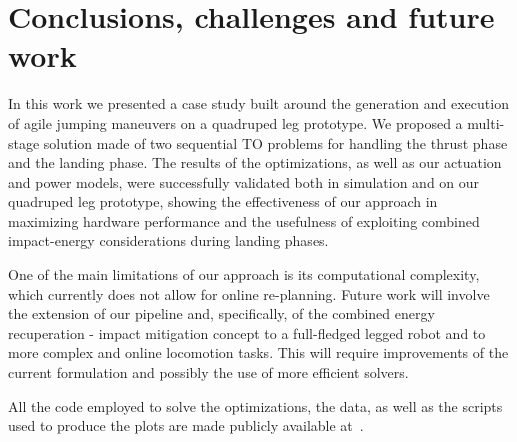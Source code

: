 \section{Conclusions, challenges and future work}\label{sec:conclusions}
In this work we presented a case study built around the generation and execution of agile jumping maneuvers on a quadruped leg prototype.  
We 
proposed a multi-stage solution 
made of two sequential TO problems for handling the thrust phase 
and the landing phase.
The results of the optimizations, as well as our actuation and power models, were successfully validated both in simulation and on our quadruped leg prototype, showing the effectiveness of our approach in maximizing hardware performance and the usefulness of exploiting combined impact-energy considerations during landing phases.

One of the main limitations of our approach is its computational complexity, which currently does not allow for online re-planning. Future work will involve the extension of our pipeline and, specifically, of the combined energy recuperation - impact mitigation concept to a full-fledged legged robot and to more complex and online locomotion tasks. This will require improvements of the current formulation and possibly the use of more efficient solvers.  

All the code employed to solve the optimizations, the  data, as well as the scripts used to produce the plots are made publicly available at~\cite{url::awesome_leg_repo}.